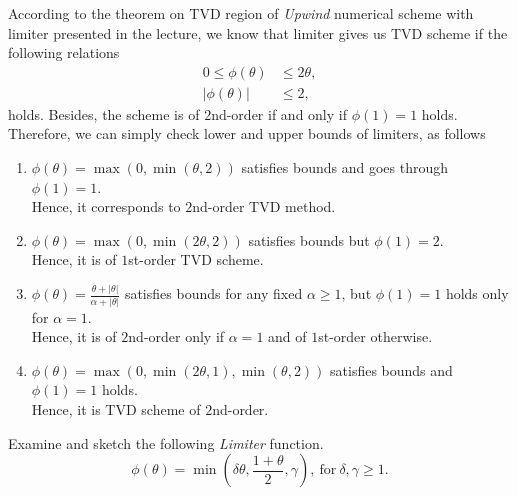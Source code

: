 \documentclass[12pt]{article}
\begin{document}
According to the theorem on TVD region of \emph{Upwind} numerical scheme with limiter
presented in the lecture, we know that limiter gives us TVD scheme if
the following relations
\begin{align*}
	0              \le \phi(\theta) & \le 2\theta, \\
	|\phi(\theta)|                  & \le 2,
\end{align*}
holds. Besides, the scheme is of $2$nd-order if and only if $\phi(1)=1$ holds.
Therefore, we can simply check lower and upper bounds of limiters, as follows
\begin{enumerate}
	\item $\displaystyle \phi(\theta) = \max(0, \min(\theta, 2))$ satisfies bounds and
	      goes through $\phi(1) = 1$.\\
	      Hence, it corresponds to $2$nd-order TVD method.
	\item $\displaystyle \phi(\theta) = \max(0, \min(2\theta, 2))$ satisfies bounds but
	      $\phi(1) = 2$.\\
	      Hence, it is of $1$st-order TVD scheme.
	\item $\displaystyle \phi(\theta) = \frac{\theta + |\theta|}{\alpha+|\theta|}$
	      satisfies bounds for any fixed $\alpha \ge 1$, but $\phi(1) = 1$ holds
	      only for $\alpha=1$.\\
	      Hence, it is of $2$nd-order only if $\alpha=1$ and
	      of $1$st-order otherwise.
	\item $\displaystyle \phi(\theta) = \max(0, \min(2\theta, 1), \min(\theta, 2))$
	      satisfies bounds and $\phi(1) = 1$ holds.\\
	      Hence, it is TVD scheme of $2$nd-order.
\end{enumerate}

\pagebreak
\begin{example}
	Examine and sketch the following \emph{Limiter} function.
	\begin{equation*}
		\phi(\theta) = 
		\min\left(\delta \theta, \frac{1+\theta}{2}, \gamma \right),\ \text{for} \ \delta,\gamma \geq 1.
	\end{equation*}
\end{example}

\clearpage
\end{document}
